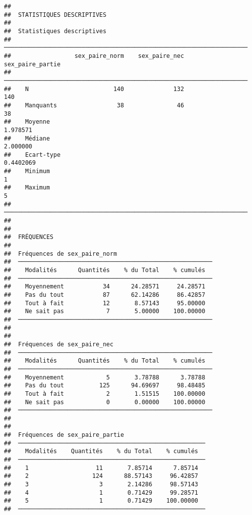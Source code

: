 \documentclass[
]{article}
\begin{document}
\begin{verbatim}
## 
##  STATISTIQUES DESCRIPTIVES
## 
##  Statistiques descriptives                                             
##  ───────────────────────────────────────────────────────────────────── 
##                  sex_paire_norm    sex_paire_nec    sex_paire_partie   
##  ───────────────────────────────────────────────────────────────────── 
##    N                        140              132                 140   
##    Manquants                 38               46                  38   
##    Moyenne                                                  1.978571   
##    Médiane                                                  2.000000   
##    Ecart-type                                              0.4402069   
##    Minimum                                                         1   
##    Maximum                                                         5   
##  ───────────────────────────────────────────────────────────────────── 
## 
## 
##  FRÉQUENCES
## 
##  Fréquences de sex_paire_norm                            
##  ─────────────────────────────────────────────────────── 
##    Modalités      Quantités    % du Total    % cumulés   
##  ─────────────────────────────────────────────────────── 
##    Moyennement           34      24.28571     24.28571   
##    Pas du tout           87      62.14286     86.42857   
##    Tout à fait           12       8.57143     95.00000   
##    Ne sait pas            7       5.00000    100.00000   
##  ─────────────────────────────────────────────────────── 
## 
## 
##  Fréquences de sex_paire_nec                             
##  ─────────────────────────────────────────────────────── 
##    Modalités      Quantités    % du Total    % cumulés   
##  ─────────────────────────────────────────────────────── 
##    Moyennement            5       3.78788      3.78788   
##    Pas du tout          125      94.69697     98.48485   
##    Tout à fait            2       1.51515    100.00000   
##    Ne sait pas            0       0.00000    100.00000   
##  ─────────────────────────────────────────────────────── 
## 
## 
##  Fréquences de sex_paire_partie                        
##  ───────────────────────────────────────────────────── 
##    Modalités    Quantités    % du Total    % cumulés   
##  ───────────────────────────────────────────────────── 
##    1                   11       7.85714      7.85714   
##    2                  124      88.57143     96.42857   
##    3                    3       2.14286     98.57143   
##    4                    1       0.71429     99.28571   
##    5                    1       0.71429    100.00000   
##  ─────────────────────────────────────────────────────
\end{verbatim}
\end{document}
